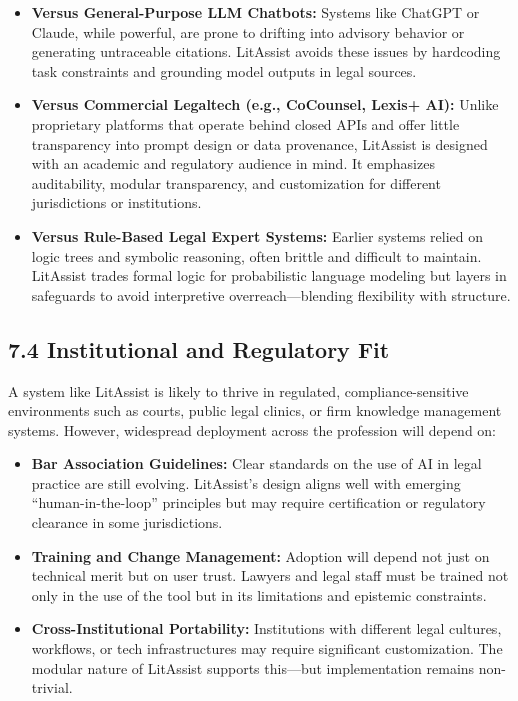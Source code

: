 \documentclass[12pt,a4paper]{article}
\begin{document}
\begin{itemize}
\item \textbf{Versus General-Purpose LLM Chatbots:} Systems like ChatGPT or Claude, while powerful, are prone to drifting into advisory behavior or generating untraceable citations. LitAssist avoids these issues by hardcoding task constraints and grounding model outputs in legal sources.

\item \textbf{Versus Commercial Legaltech (e.g., CoCounsel, Lexis+ AI):} Unlike proprietary platforms that operate behind closed APIs and offer little transparency into prompt design or data provenance, LitAssist is designed with an academic and regulatory audience in mind. It emphasizes auditability, modular transparency, and customization for different jurisdictions or institutions.

\item \textbf{Versus Rule-Based Legal Expert Systems:} Earlier systems relied on logic trees and symbolic reasoning, often brittle and difficult to maintain. LitAssist trades formal logic for probabilistic language modeling but layers in safeguards to avoid interpretive overreach—blending flexibility with structure.
\end{itemize}

\subsection*{7.4 Institutional and Regulatory Fit}

A system like LitAssist is likely to thrive in regulated, compliance-sensitive environments such as courts, public legal clinics, or firm knowledge management systems. However, widespread deployment across the profession will depend on:

\begin{itemize}
\item \textbf{Bar Association Guidelines:} Clear standards on the use of AI in legal practice are still evolving. LitAssist's design aligns well with emerging ``human-in-the-loop'' principles but may require certification or regulatory clearance in some jurisdictions.

\item \textbf{Training and Change Management:} Adoption will depend not just on technical merit but on user trust. Lawyers and legal staff must be trained not only in the use of the tool but in its limitations and epistemic constraints.

\item \textbf{Cross-Institutional Portability:} Institutions with different legal cultures, workflows, or tech infrastructures may require significant customization. The modular nature of LitAssist supports this—but implementation remains non-trivial.
\end{itemize}
\end{document}

